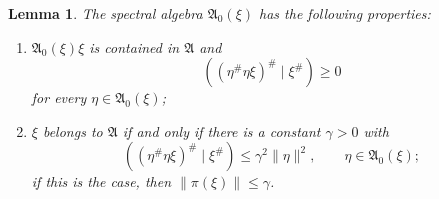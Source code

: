 \documentclass[12pt,b5paper,twoside]{article}
\theoremstyle{takesaki}
\newtheorem{lemma}{Lemma}[section]
\numberwithin{equation}{section}
\begin{document}
\begin{lemma}\label{lem:6.3}
The spectral algebra $\mathfrak A_0(\xi)$ has the following properties:
\begin{enumerate}[label=(\roman*)]
 \item $\mathfrak A_0(\xi)\xi$ is contained in $\mathfrak A$ and
 \begin{equation}
  ((\eta^\#\eta\xi)^\#\mid\xi^\#)\geq0
  \tag{6.9}\label{eq:6.9}
 \end{equation}
 for every $\eta\in\mathfrak A_0(\xi)$;

 \item $\xi$ belongs to $\mathfrak A$ if and only if there is a
 constant $\gamma>0$ with
 \begin{equation}
  ((\eta^\#\eta\xi)^\#\mid\xi^\#)
  \leq\gamma^2\|\eta\|^2,
  \qquad\eta\in\mathfrak A_0(\xi);
  \tag{6.10}\label{eq:6.10}
 \end{equation}
 if this is the case, then $\|\pi(\xi)\|\leq\gamma$.
\end{enumerate}
\end{lemma}
\end{document}
